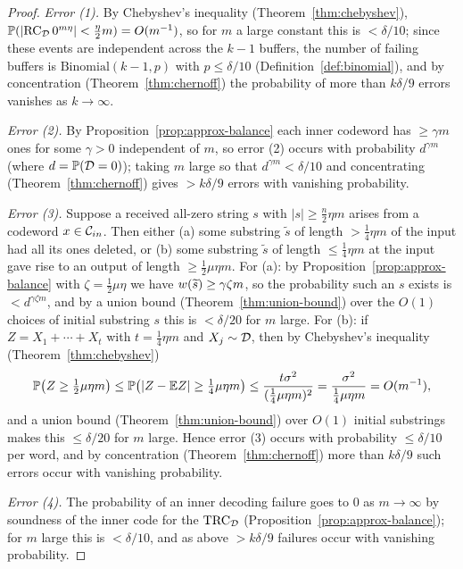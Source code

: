 \begin{proof}
  \emph{Error (1).} By Chebyshev's inequality (Theorem~\ref{thm:chebyshev}),
  $\mathbb{P}(|\mathrm{RC}_{\mathcal{D}}\,0^{m\eta}| < \tfrac{\eta}{2}m) = O(m^{-1})$, so for $m$ a
  large constant this is $<\delta/10$; since these events are independent across
  the $k-1$ buffers, the number of failing buffers is
  $\mathrm{Binomial}(k-1,p)$ with $p\le\delta/10$
  (Definition~\ref{def:binomial}), and by concentration
  (Theorem~\ref{thm:chernoff}) the probability of more than $k\delta/9$ errors
  vanishes as $k\to\infty$.

  \emph{Error (2).} By Proposition~\ref{prop:approx-balance} each inner codeword
  has $\ge\gamma m$ ones for some $\gamma>0$ independent of $m$, so error (2)
  occurs with probability $d^{\gamma m}$ (where $d=\mathbb{P}(\mathcal{D}=0)$); taking $m$
  large so that $d^{\gamma m}<\delta/10$ and concentrating
  (Theorem~\ref{thm:chernoff}) gives $>k\delta/9$ errors with vanishing
  probability.

  \emph{Error (3).} Suppose a received all-zero string $s$ with
  $|s|\ge\tfrac{n}{2}\eta m$ arises from a codeword $x\in\mathcal{C}_{in}$. Then either
  (a) some substring $\widetilde s$ of length $>\tfrac14\eta m$ of the input had
  all its ones deleted, or (b) some substring $\widetilde s$ of length
  $\le\tfrac14\eta m$ at the input gave rise to an output of length
  $\ge\tfrac12\mu\eta m$. For (a): by
  Proposition~\ref{prop:approx-balance} with $\zeta=\tfrac12\mu\eta$ we have
  $w(\widetilde s)\ge\gamma\zeta m$, so the probability such an $s$ exists is
  $<d^{\gamma\zeta m}$, and by a union bound (Theorem~\ref{thm:union-bound}) over
  the $O(1)$ choices of initial substring $s$ this is $<\delta/20$ for $m$ large.
  For (b): if $Z=X_1+\cdots+X_t$ with $t=\tfrac14\eta m$ and $X_j\sim\mathcal{D}$, then
  by Chebyshev's inequality (Theorem~\ref{thm:chebyshev})
  \[
    \mathbb{P}\big(Z\ge\tfrac12\mu\eta m\big)
      \le \mathbb{P}\big(|Z-\mathbb{E} Z|\ge\tfrac14\mu\eta m\big)
      \le \frac{t\sigma^2}{(\tfrac14\mu\eta m)^2}
      = \frac{\sigma^2}{\tfrac14\mu\eta m}
      = O(m^{-1}),
  \]
  and a union bound (Theorem~\ref{thm:union-bound}) over $O(1)$ initial
  substrings makes this $\le\delta/20$ for $m$ large. Hence error (3) occurs with
  probability $\le\delta/10$ per word, and by concentration
  (Theorem~\ref{thm:chernoff}) more than $k\delta/9$ such errors occur with
  vanishing probability.

  \emph{Error (4).} The probability of an inner decoding failure goes to $0$ as
  $m\to\infty$ by soundness of the inner code for the $\mathrm{TRC}_{\mathcal{D}}$
  (Proposition~\ref{prop:approx-balance}); for $m$ large this is $<\delta/10$,
  and as above $>k\delta/9$ failures occur with vanishing probability.


\end{proof}
